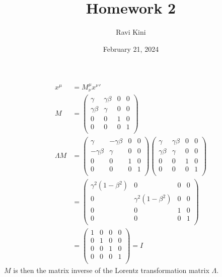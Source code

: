\documentclass{article}
\title{Homework 2}
\author{Ravi Kini}
\date{February 21, 2024}
\begin{document}
\maketitle

\begin{equation}
    \begin{split}
        x^{\mu} & = M_{\nu}^{\mu}{x^{\nu}}' \\
        M & = \begin{pmatrix}
            \gamma & \gamma\beta & 0 & 0 \\
            \gamma\beta & \gamma & 0 & 0 \\
            0 & 0 & 1 & 0 \\
            0 & 0 & 0 & 1 \\
        \end{pmatrix} \\
        \Lambda M & = \begin{pmatrix}
            \gamma & -\gamma\beta & 0 & 0 \\
            -\gamma\beta & \gamma & 0 & 0 \\
            0 & 0 & 1 & 0 \\
            0 & 0 & 0 & 1 \\
        \end{pmatrix}\begin{pmatrix}
            \gamma & \gamma\beta & 0 & 0 \\
            \gamma\beta & \gamma & 0 & 0 \\
            0 & 0 & 1 & 0 \\
            0 & 0 & 0 & 1 \\
        \end{pmatrix} \\
        & = \begin{pmatrix}
            \gamma^2(1 - \beta^2) & 0 & 0 & 0 \\
            0 & \gamma^2(1 - \beta^2) & 0 & 0 \\
            0 & 0 & 1 & 0 \\
            0 & 0 & 0 & 1 \\
        \end{pmatrix} \\
        & = \begin{pmatrix}
            1 & 0 & 0 & 0 \\
            0 & 1 & 0 & 0 \\
            0 & 0 & 1 & 0 \\
            0 & 0 & 0 & 1 \\
        \end{pmatrix} = I
    \end{split}
\end{equation}
$M$ is then the matrix inverse of the Lorentz transformation matrix $\Lambda$.
\clearpage
\end{document}
